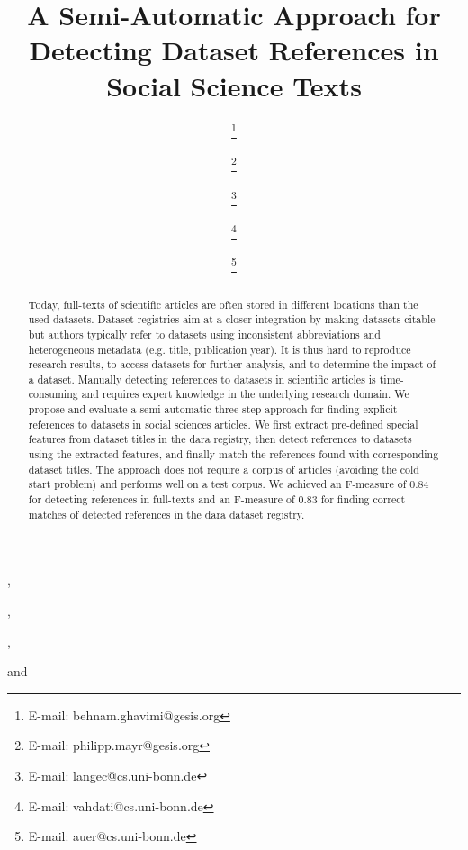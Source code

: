 \documentclass{IOS-Book-Article}
\newcommand{\dara}{\textsf{da\textbar ra}}
\begin{document}
\pagestyle{headings}
\def\thepage{}

\begin{frontmatter}
\title{A Semi-Automatic Approach for Detecting Dataset References in Social Science Texts} %

\author[A,B]{ 
\thanks{E-mail: behnam.ghavimi@gesis.org}},
\author[A]{ 
\thanks{E-mail: philipp.mayr@gesis.org}},
\author[B,C]{  
\thanks{E-mail: langec@cs.uni-bonn.de}},
\author[B]{ 
\thanks{E-mail: vahdati@cs.uni-bonn.de}}
and
\author[B,C]{  
\thanks{E-mail: auer@cs.uni-bonn.de}}

\address[A]{GESIS – Leibniz Institute for the Social Sciences}
\address[B]{Enterprise Information Systems (EIS), University of Bonn}
\address[C]{Fraunhofer Institute for Intelligent Analysis and Information Systems IAIS}
\begin{abstract}
Today, full-texts of scientific articles are often stored in different locations than the used datasets.
Dataset registries aim at a closer integration by making datasets citable 
but authors typically refer to datasets using inconsistent abbreviations and heterogeneous metadata (e.g. title, publication year).
It is thus hard to reproduce research results, to access datasets for further analysis, and to determine the impact of a dataset.
Manually detecting references to datasets in scientific articles is time-consuming and requires expert knowledge in the underlying research domain. 
We propose and evaluate a semi-automatic three-step approach for finding explicit references to datasets in social sciences articles.
We first extract pre-defined special features from dataset titles in the {\dara} registry, then detect references to datasets using the extracted features, and finally match the references found with corresponding dataset titles.
The approach does not require a corpus of articles (avoiding the cold start problem) and performs well on a test corpus. 
We achieved an F-measure of 0.84 for detecting references in full-texts and an F-measure of 0.83 for finding correct matches of detected references in the {\dara} dataset registry.


\end{abstract}
\end{frontmatter}
\end{document}
